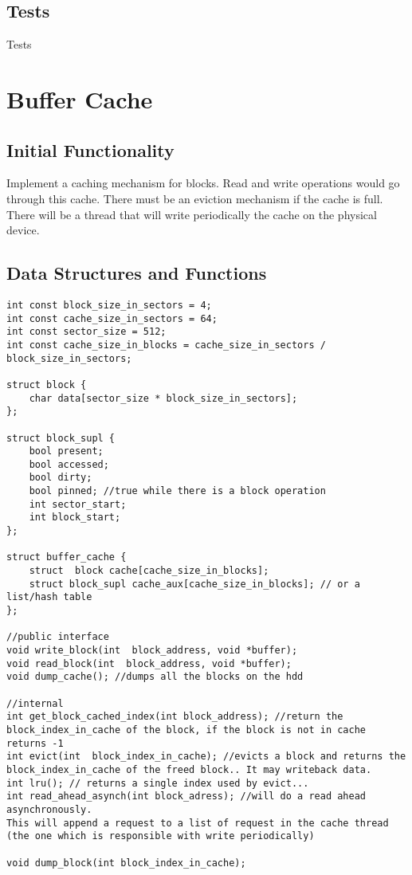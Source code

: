 \subsection{Tests}

Tests

\section{Buffer Cache}
\subsection{Initial Functionality}
Implement a caching mechanism for blocks. Read and write operations would go through this cache. There must be an eviction mechanism if the cache is full.
There will be a thread that will write periodically the cache on the physical device.
  

\subsection{Data Structures and Functions}
\begin{lstlisting}
int const block_size_in_sectors = 4;
int const cache_size_in_sectors = 64;
int const sector_size = 512;
int const cache_size_in_blocks = cache_size_in_sectors /  block_size_in_sectors;

struct block {
	char data[sector_size * block_size_in_sectors]; 
};

struct block_supl {
	bool present;
	bool accessed;
	bool dirty;
	bool pinned; //true while there is a block operation
	int sector_start;
	int block_start;
};

struct buffer_cache {
	struct	block cache[cache_size_in_blocks]; 
	struct block_supl cache_aux[cache_size_in_blocks]; // or a list/hash table
};

//public interface
void write_block(int  block_address, void *buffer);
void read_block(int  block_address, void *buffer);
void dump_cache(); //dumps all the blocks on the hdd

//internal
int get_block_cached_index(int block_address); //return the  block_index_in_cache of the block, if the block is not in cache returns -1
int evict(int  block_index_in_cache); //evicts a block and returns the  block_index_in_cache of the freed block.. It may writeback data.
int lru(); // returns a single index used by evict...
int read_ahead_asynch(int block_adress); //will do a read ahead asynchronously. 
This will append a request to a list of request in the cache thread (the one which is responsible with write periodically)

void dump_block(int block_index_in_cache);
\end{lstlisting}


